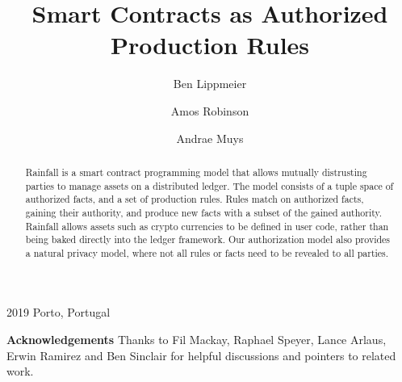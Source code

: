 \documentclass[format=sigconf, review=true, screen=true]{acmart}
\begin{document}
        {2019}
        {Porto, Portugal}

\title{Smart Contracts as Authorized Production Rules}

\author{Ben Lippmeier}

\author{Amos Robinson}

\author{Andrae Muys}

\begin{abstract}
Rainfall is a smart contract programming model that allows mutually distrusting parties to manage assets on a distributed ledger. The model consists of a tuple space of authorized facts, and a set of production rules. Rules match on authorized facts, gaining their authority, and produce new facts with a subset of the gained authority. Rainfall allows assets such as crypto currencies to be defined in user code, rather than being baked directly into the ledger framework. Our authorization model also provides a natural privacy model, where not all rules or facts need to be revealed to all parties.
\end{abstract}

\maketitle
\makeatactive










\textbf{Acknowledgements}
Thanks to Fil Mackay, Raphael Speyer, Lance Arlaus, Erwin Ramirez and Ben Sinclair for helpful discussions and pointers to related work.




\clearpage{}


\end{document}
